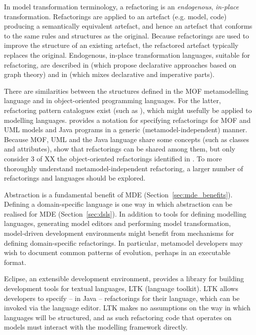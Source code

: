 In model transformation terminology, a refactoring is an \emph{endogenous}, \emph{in-place} transformation. Refactorings are applied to an artefact (e.g. model, code) producing a semantically equivalent artefact, and hence an artefact that conforms to the same rules and structures as the original. Because refactorings are used to improve the structure of an existing artefact, the refactored artefact typically replaces the original. Endogenous, in-place transformation languages, suitable for refactoring, are described in \cite{biermann06refactoring,porres03refactoring} (which propose declarative approaches based on graph theory) and in \cite{kolovos07ewl} (which mixes declarative and imperative parts).

There are similarities between the structures defined in the MOF metamodelling language and in object-oriented programming languages. For the latter, refactoring pattern catalogues exist (such as \cite{fowler99refactoring}), which might usefully be applied to modelling languages. \cite{moha09refactoring} provides a notation for specifying refactorings for MOF and UML models and Java programs in a generic (metamodel-independent) manner. Because MOF, UML and the Java language share some concepts (such as classes and attributes), \cite{moha09refactoring} show that refactorings can be shared among them, but only consider 3 of XX the object-oriented refactorings identified in \cite{fowler99refactoring}. To more thoroughly understand metamodel-independent refactoring, a larger number of refactorings and languages should be explored.

Abstraction is a fundamental benefit of MDE (Section~\ref{sec:mde_benefits}). Defining a domain-specific language is one way in which abstraction can be realised for MDE (Section~\ref{sec:dsls}). In addition to tools for defining modelling languages, generating model editors and performing model transformation, model-driven development environments might benefit from mechanisms for defining domain-specific refactorings. In particular, metamodel developers may wish to document common patterns of evolution, perhaps in an executable format.

Eclipse, an extensible development environment, provides a library for building development tools for textual languages, LTK (language toolkit). LTK allows developers to specify -- in Java -- refactorings for their language, which can be invoked via the language editor. LTK makes no assumptions on the way in which languages will be structured, and as such refactoring code that operates on models must interact with the modelling framework directly.

